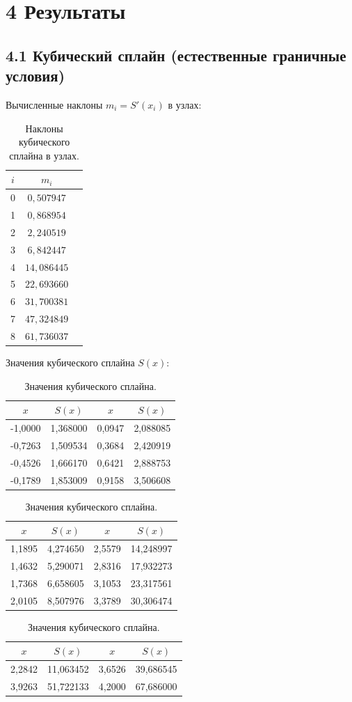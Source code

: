 \documentclass[14pt,a4paper]{extarticle}
\begin{document}
\newpage

\section*{4 Результаты}

\subsection*{4.1 Кубический сплайн (естественные граничные условия)}

Вычисленные наклоны $m_i = S'(x_i)$ в узлах:

\begin{table}[h]
\centering
\caption{Наклоны кубического сплайна в узлах.}
\begin{tabular}{|c|c|c|}
\hline
$i$ & $m_i$ \\ \hline
0 & $0{,}507947$ \\ \hline
1 & $0{,}868954$ \\ \hline
2 & $2{,}240519$ \\ \hline
3 & $6{,}842447$ \\ \hline
4 & $14{,}086445$ \\ \hline
5 & $22{,}693660$ \\ \hline
6 & $31{,}700381$ \\ \hline
7 & $47{,}324849$ \\ \hline
8 & $61{,}736037$ \\ \hline
\end{tabular}
\end{table}

Значения кубического сплайна $S(x)$:

\begin{table}[h]
\centering
\caption{Значения кубического сплайна.}
\begin{tabular}{|c|c||c|c|}
\hline
$x$ & $S(x)$ & $x$ & $S(x)$ \\ \hline
-1,0000 & 1,368000 & 0,0947 & 2,088085 \\
-0,7263 & 1,509534 & 0,3684 & 2,420919 \\
-0,4526 & 1,666170 & 0,6421 & 2,888753 \\
-0,1789 & 1,853009 & 0,9158 & 3,506608 \\ \hline
\end{tabular}
\begin{tabular}{|c|c||c|c|}
\hline
$x$ & $S(x)$ & $x$ & $S(x)$ \\ \hline
1,1895 & 4,274650 & 2,5579 & 14,248997 \\
1,4632 & 5,290071 & 2,8316 & 17,932273 \\
1,7368 & 6,658605 & 3,1053 & 23,317561 \\
2,0105 & 8,507976 & 3,3789 & 30,306474 \\ \hline
\end{tabular}
\begin{tabular}{|c|c||c|c|}
\hline
$x$ & $S(x)$ & $x$ & $S(x)$ \\ \hline
2,2842 & 11,063452 & 3,6526 & 39,686545 \\
3,9263 & 51,722133 & 4,2000 & 67,686000 \\ \hline
\end{tabular}
\end{table}
\end{document}
